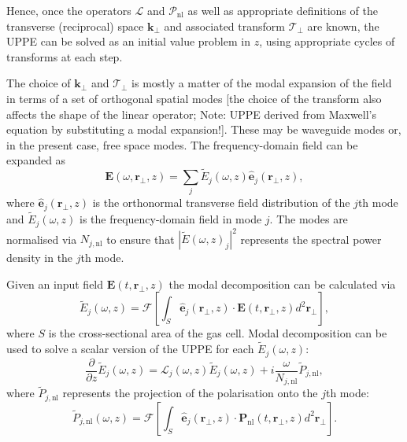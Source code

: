 \documentclass[a4paper]{jpconf}
\begin{document}
Hence, once the operators $\mathcal{L}$ and $\mathcal{P}_\text{nl}$ as well as appropriate definitions of the transverse (reciprocal) space $\mathbf{k}_\perp$ and associated transform $\mathcal{T}_\perp$ are known, the UPPE can be solved as an initial value problem in $z$, using appropriate cycles of transforms at each step. \par 
The choice of $\mathbf{k}_\perp$ and $\mathcal{T}_\perp$ is mostly a matter of the modal expansion of the field in terms of a set of orthogonal spatial modes [the choice of the transform also affects the shape of the linear operator; Note: UPPE derived from Maxwell's equation by substituting a modal expansion!]. These may be waveguide modes or, in the present case, free space modes. The frequency-domain field can be expanded as 
\begin{equation}
\mathbf{E}(\omega, \mathbf{r}_\perp, z) = \sum_j \tilde{E}_j (\omega,z)  \hat{\mathbf{e}}_j (\mathbf{r}_\perp, z),
\end{equation}
where $\hat{\mathbf{e}}_j (\mathbf{r}_\perp, z)$ is the orthonormal transverse field distribution of the $j$th mode and $\tilde{E}_j (\omega,z)$ is the frequency-domain field in mode $j$. The modes are normalised via $N_{j, \text{nl}}$ to ensure that $|\tilde{E}(\omega,z)_j|^2$ represents the spectral power density in the $j$th mode. \par 
Given an input field $\mathbf{E}(t, \mathbf{r}_\perp, z)$ the modal decomposition can be calculated via 
\begin{equation}
\tilde{E}_j (\omega,z) = \mathcal{F}\left[ \int_S \hat{\mathbf{e}}_j(\mathbf{r}_\perp,z) \cdot \mathbf{E}(t, \mathbf{r}_\perp, z) d^2 \mathbf{r}_\perp \right],
\end{equation}
where $S$ is the cross-sectional area of the gas cell. Modal decomposition can be used to solve  a scalar version of the UPPE for each $\tilde{E}_j(\omega,z)$:
\begin{equation}
\frac{\partial}{\partial z} \tilde{E}_j(\omega,z) = \mathcal{L}_j (\omega,z) \tilde{E}_j(\omega,z)+ i\frac{\omega}{N_{j, \text{nl}}} \tilde{P}_{j,\text{nl}},
\end{equation}
where $\tilde{P}_{j,\text{nl}}$ represents the projection of the polarisation onto the $j$th mode:
\begin{equation}
\tilde{P}_{j, \text{nl}}(\omega, z) =\mathcal{F}\left[ \int_S \hat{\mathbf{e}}_j(\mathbf{r}_\perp,z) \cdot \mathbf{P}_{\text{nl}}(t, \mathbf{r}_\perp, z) d^2 \mathbf{r}_\perp \right].
\end{equation}
\end{document}
